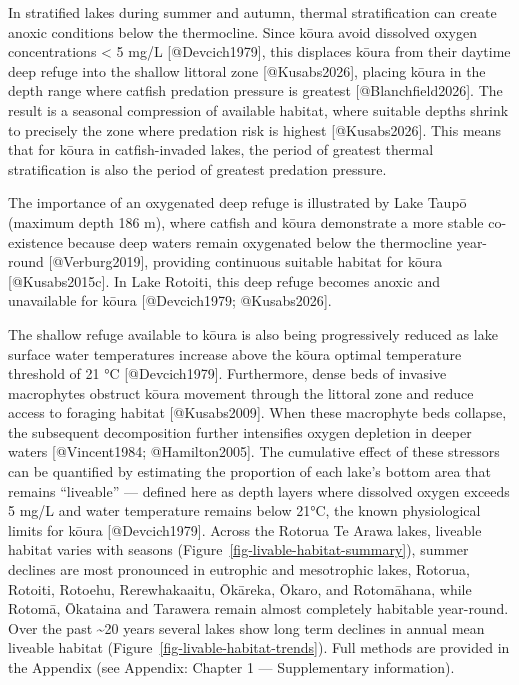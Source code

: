 \documentclass[
  letterpaper,
  DIV=11,
  numbers=noendperiod]{scrartcl}
\begin{document}
In stratified lakes during summer and autumn, thermal stratification can
create anoxic conditions below the thermocline. Since kōura avoid
dissolved oxygen concentrations \textless{} 5 mg/L {[}@Devcich1979{]},
this displaces kōura from their daytime deep refuge into the shallow
littoral zone {[}@Kusabs2026{]}, placing kōura in the depth range where
catfish predation pressure is greatest {[}@Blanchfield2026{]}. The
result is a seasonal compression of available habitat, where suitable
depths shrink to precisely the zone where predation risk is highest
{[}@Kusabs2026{]}. This means that for kōura in catfish-invaded lakes,
the period of greatest thermal stratification is also the period of
greatest predation pressure.

The importance of an oxygenated deep refuge is illustrated by Lake Taupō
(maximum depth 186 m), where catfish and kōura demonstrate a more stable
co-existence because deep waters remain oxygenated below the thermocline
year-round {[}@Verburg2019{]}, providing continuous suitable habitat for
kōura {[}@Kusabs2015c{]}. In Lake Rotoiti, this deep refuge becomes
anoxic and unavailable for kōura {[}@Devcich1979; @Kusabs2026{]}.

The shallow refuge available to kōura is also being progressively
reduced as lake surface water temperatures increase above the kōura
optimal temperature threshold of 21 °C {[}@Devcich1979{]}. Furthermore,
dense beds of invasive macrophytes obstruct kōura movement through the
littoral zone and reduce access to foraging habitat {[}@Kusabs2009{]}.
When these macrophyte beds collapse, the subsequent decomposition
further intensifies oxygen depletion in deeper waters {[}@Vincent1984;
@Hamilton2005{]}. The cumulative effect of these stressors can be
quantified by estimating the proportion of each lake's bottom area that
remains ``liveable'' --- defined here as depth layers where dissolved
oxygen exceeds 5 mg/L and water temperature remains below 21°C, the
known physiological limits for kōura {[}@Devcich1979{]}. Across the
Rotorua Te Arawa lakes, liveable habitat varies with seasons
(Figure~\ref{fig-livable-habitat-summary}), summer declines are most
pronounced in eutrophic and mesotrophic lakes, Rotorua, Rotoiti,
Rotoehu, Rerewhakaaitu, Ōkāreka, Ōkaro, and Rotomāhana, while Rotomā,
Ōkataina and Tarawera remain almost completely habitable year-round.
Over the past \textasciitilde20 years several lakes show long term
declines in annual mean liveable habitat
(Figure~\ref{fig-livable-habitat-trends}). Full methods are provided in
the Appendix (see Appendix: Chapter 1 --- Supplementary information).
\end{document}
